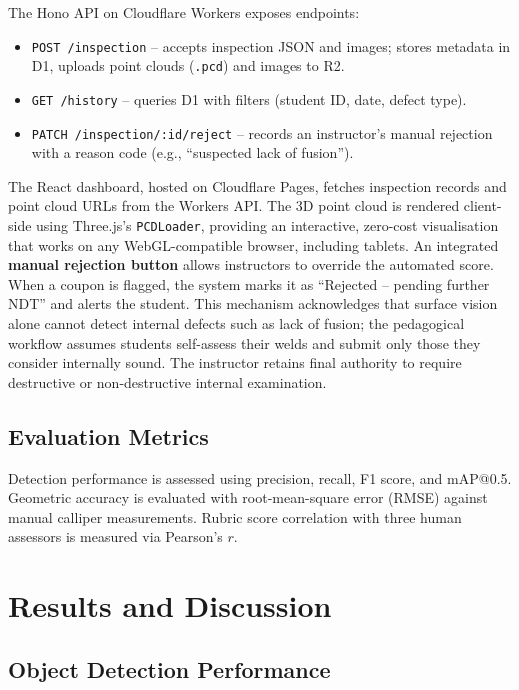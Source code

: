 \documentclass[12pt,a4paper]{article}
\begin{document}
The Hono API on Cloudflare Workers exposes endpoints:
\begin{itemize}[leftmargin=*, itemsep=2pt]
  \item \texttt{POST /inspection} -- accepts inspection JSON and images; stores metadata in D1, uploads point
        clouds (\texttt{.pcd}) and images to R2.
  \item \texttt{GET /history} -- queries D1 with filters (student ID, date, defect type).
  \item \texttt{PATCH /inspection/:id/reject} -- records an instructor's manual rejection with a reason code
        (e.g., ``suspected lack of fusion'').
\end{itemize}

The React dashboard, hosted on Cloudflare Pages, fetches inspection records and point cloud URLs from the
Workers API. The 3D point cloud is rendered client-side using Three.js's \texttt{PCDLoader}, providing an
interactive, zero-cost visualisation that works on any WebGL-compatible browser, including tablets. An
integrated \textbf{manual rejection button} allows instructors to override the automated score. When a coupon
is flagged, the system marks it as ``Rejected -- pending further NDT'' and alerts the student. This mechanism
acknowledges that surface vision alone cannot detect internal defects such as lack of fusion; the pedagogical
workflow assumes students self-assess their welds and submit only those they consider internally sound. The
instructor retains final authority to require destructive or non-destructive internal examination.

\subsection{Evaluation Metrics}
Detection performance is assessed using precision, recall, F1 score, and mAP@0.5. Geometric accuracy is
evaluated with root-mean-square error (RMSE) against manual calliper measurements. Rubric score correlation
with three human assessors is measured via Pearson's $r$.

\section{Results and Discussion}

\subsection{Object Detection Performance}
\end{document}
